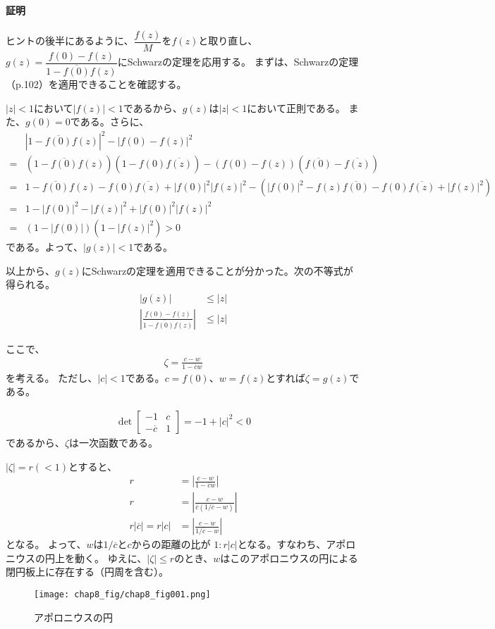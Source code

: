 \paragraph{証明}
ヒントの後半にあるように、$\dfrac{f(z)}{M}$を$f(z)$と取り直し、$g(z)=\dfrac{f(0)-f(z)}{1-\overline{f(0)}f(z)}$にSchwarzの定理を応用する。
まずは、Schwarzの定理（p.102）を適用できることを確認する。

$|z|<1$において$|f(z)|<1$であるから、$g(z)$は$|z|<1$において正則である。
また、$g(0)=0$である。さらに、
\begin{align*}
    &|1-\overline{f(0)}f(z)|^2-|f(0)-f(z)|^2\\
    =&(1-\overline{f(0)}f(z))(1-f(0)\overline{f(z)})-(f(0)-f(z))(\overline{f(0)}-\overline{f(z)})\\
    =&1-\overline{f(0)}f(z)-f(0)\overline{f(z)}+|f(0)|^2|f(z)|^2-(|f(0)|^2-f(z)\overline{f(0)}-f(0)\overline{f(z)}+|f(z)|^2)\\
    =&1-|f(0)|^2-|f(z)|^2+|f(0)|^2|f(z)|^2\\
    =&(1-|f(0)|)(1-|f(z)|^2)>0
\end{align*}
である。よって、$|g(z)|<1$である。

以上から、$g(z)$にSchwarzの定理を適用できることが分かった。次の不等式が得られる。
\begin{align*}
    |g(z)|&\le|z|\\
    \left|\frac{f(0)-f(z)}{1-\overline{f(0)}f(z)}\right|&\le|z|
\end{align*}

ここで、
\begin{align*}
    \zeta=\frac{c-w}{1-\overline{c}w}
\end{align*}
を考える。
ただし、$|c|<1$である。$c=f(0)$、$w=f(z)$とすれば$\zeta=g(z)$である。

\begin{align*}
    \det\begin{bmatrix}
        -1&c\\-\overline{c}&1
    \end{bmatrix}
    =-1+|c|^2<0
\end{align*}
であるから、$\zeta$は一次函数である。

$|\zeta|=r(<1)$とすると、
\begin{align*}
    r&=\left|\frac{c-w}{1-\overline{c}w}\right|\\
    r&=\left|\frac{c-w}{\overline{c}(1/\overline{c}-w)}\right|\\
    r|\overline{c}|=r|c|&=\left|\frac{c-w}{1/\overline{c}-w}\right|
\end{align*}
となる。
よって、$w$は$1/\overline{c}$と$c$からの距離の比が
$1:r|c|$となる。すなわち、アポロニウスの円上を動く。
ゆえに、$|\zeta|\le r$のとき、$w$はこのアポロニウスの円による閉円板上に存在する（円周を含む）。
\begin{figure}[h]
    \centering
    \texttt{[image: chap8\_fig/chap8\_fig001.png]}
    \caption{アポロニウスの円}
    \label{fig:chap8_apo}
\end{figure}

